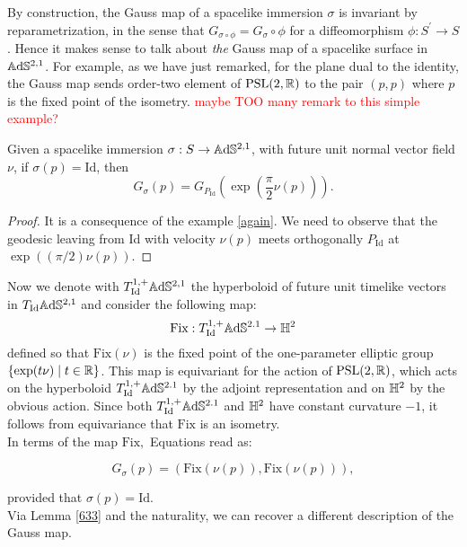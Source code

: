    By construction, the Gauss map of a spacelike immersion $\sigma$ is invariant by reparametrization, in the sense that $G_{\sigma\circ\phi}=G_\sigma\circ\phi$ for a diffeomorphism $\phi:S^{\prime} \to S$. Hence it makes sense to talk about \textit{the} Gauss map of a spacelike surface in $\mathbb{A}\mathrm{d}\mathbb{S}^{2,1}$. For example, as we have just remarked, for the plane dual to the identity, the Gauss map sends order-two element of $\text{PSL}(2,\mathbb{R})$ to the pair $(p,p)$ where $p$ is the fixed point of the isometry. \textcolor{red}{maybe TOO many remark to this simple example?} 
    
    \begin{lemma}\label{633}
        Given a spacelike immersion $\sigma:S\to\mathbb{A}\mathrm{d}\mathbb{S}^{2,1}$, with future unit normal vector field $\nu$, if $\sigma(p)=\text{Id}$, then 
        \begin{equation}\label{gaussmap}
            G_\sigma(p)=G_{P_\text{Id}}(\exp(\frac{\pi}{2}\nu(p))).
        \end{equation}
    \end{lemma}
    \begin{proof}
        It is a consequence of the example \ref{again}. We need to observe that the geodesic leaving from Id with velocity $\nu(p)$ meets orthogonally $P_\text{Id}$ at $\exp((\pi/2)\nu(p)).$
    \end{proof}

    Now we denote with $T_{\text{Id}}^{1,+}\mathbb{A}\mathrm{d}\mathbb{S}^{2,1}$ the hyperboloid of future unit timelike vectors in $T_{\text{Id}}\mathbb{A}\mathrm{d}\mathbb{S}^{2,1}$ and consider the following map: 
    \[
        \text{Fix}:T_{\text{Id}}^{1,+}\mathbb{A}\mathrm{d}\mathbb{S}^{2.1}\to\mathbb{H}^2
    \]
    defined so that $\text{Fix}(\nu)$ is the fixed point of the one-parameter elliptic group $\{\exp(t\nu)\;|\;t\in\mathbb{R}\}$. This map is equivariant for the action of $\text{PSL}(2,\mathbb{R})$, which acts on the hyperboloid $T_{\text{Id}}^{1,+}\mathbb{A}\mathrm{d}\mathbb{S}^{2.1}$ by the adjoint representation and on $\mathbb{H}^2$ by the obvious action. Since both $T_{\text{Id}}^{1,+}\mathbb{A}\mathrm{d}\mathbb{S}^{2.1}$ and $\mathbb{H}^2$ have constant curvature $-1$, it follows from equivariance that $\text{Fix}$ is an isometry.  \\
    In terms of the map $\text{Fix},$ Equations  read as: 

    \begin{equation}\label{66}
        G_\sigma(p)=(\text{Fix}(\nu(p)),\text{Fix}(\nu(p))),
    \end{equation}

    provided that $\sigma(p)=\text{Id}.$\\ Via Lemma \ref{633} and the naturality, we can recover a different description of the Gauss map. 

